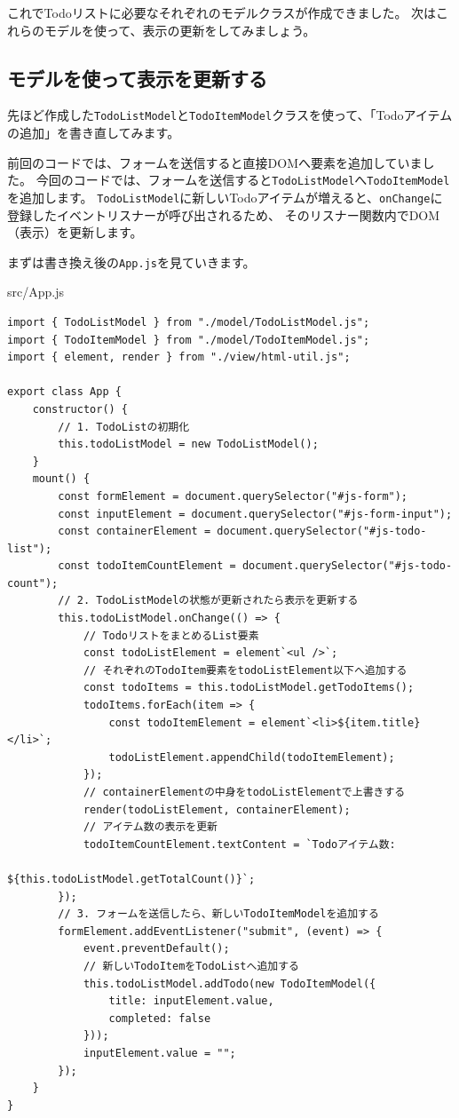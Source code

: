 これでTodoリストに必要なそれぞれのモデルクラスが作成できました。
次はこれらのモデルを使って、表示の更新をしてみましょう。

\hypertarget{model-update-view}{%
\subsection{モデルを使って表示を更新する}\label{model-update-view}}

先ほど作成した\texttt{TodoListModel}と\texttt{TodoItemModel}クラスを使って、「Todoアイテムの追加」を書き直してみます。

前回のコードでは、フォームを送信すると直接DOMへ要素を追加していました。
今回のコードでは、フォームを送信すると\texttt{TodoListModel}へ\texttt{TodoItemModel}を追加します。
\texttt{TodoListModel}に新しいTodoアイテムが増えると、\texttt{onChange}に登録したイベントリスナーが呼び出されるため、
そのリスナー関数内でDOM（表示）を更新します。

まずは書き換え後の\texttt{App.js}を見ていきます。

\begin{listtitle}
src/App.js
\end{listtitle}
\begin{lstlisting}
import { TodoListModel } from "./model/TodoListModel.js";
import { TodoItemModel } from "./model/TodoItemModel.js";
import { element, render } from "./view/html-util.js";

export class App {
    constructor() {
        // 1. TodoListの初期化
        this.todoListModel = new TodoListModel();
    }
    mount() {
        const formElement = document.querySelector("#js-form");
        const inputElement = document.querySelector("#js-form-input");
        const containerElement = document.querySelector("#js-todo-list");
        const todoItemCountElement = document.querySelector("#js-todo-count");
        // 2. TodoListModelの状態が更新されたら表示を更新する
        this.todoListModel.onChange(() => {
            // TodoリストをまとめるList要素
            const todoListElement = element`<ul />`;
            // それぞれのTodoItem要素をtodoListElement以下へ追加する
            const todoItems = this.todoListModel.getTodoItems();
            todoItems.forEach(item => {
                const todoItemElement = element`<li>${item.title}</li>`;
                todoListElement.appendChild(todoItemElement);
            });
            // containerElementの中身をtodoListElementで上書きする
            render(todoListElement, containerElement);
            // アイテム数の表示を更新
            todoItemCountElement.textContent = `Todoアイテム数: 
                                      ${this.todoListModel.getTotalCount()}`;
        });
        // 3. フォームを送信したら、新しいTodoItemModelを追加する
        formElement.addEventListener("submit", (event) => {
            event.preventDefault();
            // 新しいTodoItemをTodoListへ追加する
            this.todoListModel.addTodo(new TodoItemModel({
                title: inputElement.value,
                completed: false
            }));
            inputElement.value = "";
        });
    }
}
\end{lstlisting}
\listend

